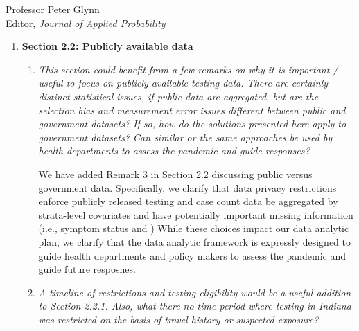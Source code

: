 \documentclass[11pt]{letter} %
\begin{document}
\begin{letter}{Professor
	Peter Glynn\\
	Editor, {\em Journal of Applied Probability}}
\begin{enumerate}
\begin{enumerate}
	\vspace{5mm}
	\item {\it Consider adding some additional information on screening tests, particular anything relevant to the random sample conducted in Indiana which is used as the validation set. Were the screening tests conducted using nasopharyngeal swabs (in many places screening tests use nasal swabs instead and often self-collected samples)? Were the molecular tests used to assay the samples the same for screening and diagnostic tests? Differences in sample collection and testing processes could undermine the utility of this random sample as a validation set.}
	\vspace{5mm}

	We clarify that, to the best of our knowledge, both Indiana Department of Health's (IDOH) molecular testing and the random state-wide sample relied primarily on nasopharyngeal swab using the same set of RT-PCR tests. This was primarily due to the random sampling being done by a scientific team working closely with the IDOH.
	\vspace{5mm}
\end{enumerate}
\item {\bf Section 2.2: Publicly available data}
\begin{enumerate}
	\item {\it This section could benefit from a few remarks on why it is important / useful to focus on publicly available testing data. There are certainly distinct statistical issues, if public data are aggregated, but are the selection bias and measurement error issues different between public and government datasets? If so, how do the solutions presented here apply to government datasets? Can similar or the same approaches be used by health departments to assess the pandemic and guide responses?}
	\vspace{5mm}

	We have added Remark 3 in Section 2.2 discussing public versus government data.  Specifically, we clarify that data privacy restrictions enforce publicly released testing and case count data be aggregated by strata-level covariates and have potentially important missing information (i.e., symptom status and )
	While these choices impact our data analytic plan, we clarify that the data analytic framework is expressly designed to guide health departments and policy makers to assess the pandemic and guide future resposnes.

	\vspace{5mm}
	\item {\it A timeline of restrictions and testing eligibility would be a useful addition to Section 2.2.1. Also, what there no time period where testing in Indiana was restricted on the basis of travel history or suspected exposure?}
	\vspace{5mm}


\end{enumerate}
\end{enumerate}
\end{letter}
\end{document}
